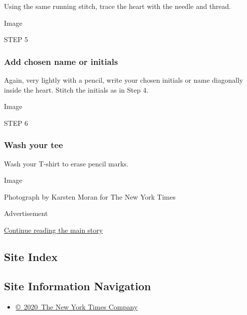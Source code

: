 Using the same running stitch, trace the heart with the needle and
thread.

Image

STEP 5

\hypertarget{add-chosen-name-or-initials}{%
\subsubsection{\texorpdfstring{\textbf{Add chosen name or
initials}}{Add chosen name or initials}}\label{add-chosen-name-or-initials}}

Again, very lightly with a pencil, write your chosen initials or name
diagonally inside the heart. Stitch the initials as in Step 4.

Image

STEP 6

\hypertarget{wash-your-tee}{%
\subsubsection{\texorpdfstring{\textbf{Wash your
tee}}{Wash your tee}}\label{wash-your-tee}}

Wash your T-shirt to erase pencil marks.

Image

Photograph by Karsten Moran for The New York Times

Advertisement

\protect\hyperlink{after-bottom}{Continue reading the main story}

\hypertarget{site-index}{%
\subsection{Site Index}\label{site-index}}

\hypertarget{site-information-navigation}{%
\subsection{Site Information
Navigation}\label{site-information-navigation}}

\begin{itemize}
\tightlist
\item
  \href{https://help.nytimes.com/hc/en-us/articles/115014792127-Copyright-notice}{©~2020~The
  New York Times Company}
\end{itemize}

